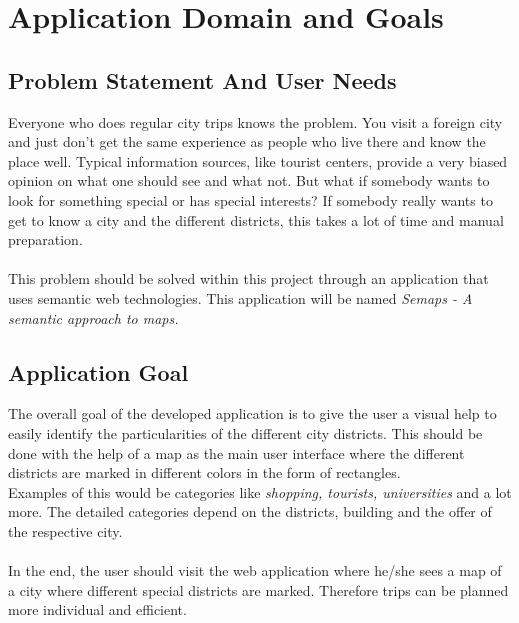 \section{Application Domain and Goals}

\subsection{Problem Statement And User Needs}
Everyone who does regular city trips knows the problem. You visit a foreign city and just don’t get the same experience as people who live there and know the place well. Typical information sources, like tourist centers, provide a very biased opinion on what one should see and what not. But what if somebody wants to look for something special or has special interests? If somebody really wants to get to know a city and the different districts,  this takes a lot of time and manual preparation. \\ \\
This problem should be solved within this project through an application that uses semantic web technologies. This application will be named \textit{Semaps - A semantic approach to maps.} 

\subsection{Application Goal}
The overall goal of the developed application is to give the user a visual help to easily identify the particularities of the different city districts. This should be done with the help of a map as the main user interface where the different districts are marked in different colors in the form of rectangles.
\\
Examples of this would be categories like \textit{shopping, tourists, universities} and a lot more. The detailed categories depend on the districts, building and the offer of the respective city. 
\\ \\
In the end, the user should visit the web application where he/she sees a map of a city where different special districts are marked. Therefore trips can be planned more individual and efficient.
